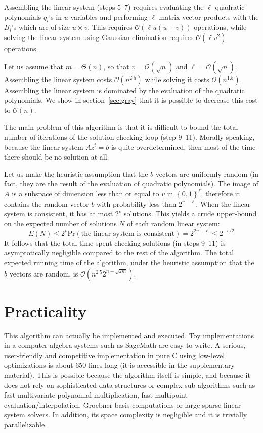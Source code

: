 \documentclass[a4paper,UKenglish,cleveref, autoref]{lipics-v2019}
\newcommand{\bits}{\left\{0, 1\right\}}
\newcommand{\bigO}[1]{\ensuremath{\mathcal{O}\left( #1 \right)} }
\newcommand{\bigTheta}[1]{\ensuremath{\Theta\left( #1 \right)} }
\begin{document}
Assembling the linear system (steps 5--7) requires evaluating the $\ell$
quadratic polynomials $q_i$'s in $u$ variables and performing $\ell$
matrix-vector products with the $B_i$'s which are of size $u \times v$.  This
requires $\bigO{\ell u(u+v)}$ operations, while solving the linear system using
Gaussian elimination requires $\bigO{\ell v^2}$ operations.

Let us assume that $m = \bigTheta{n}$, so that $v = \bigO{\sqrt{n}}$ and
$\ell = \bigO{\sqrt{n}}$. Assembling the linear system costs $\bigO{n^{2.5}}$
while solving it costs $\bigO{n^{1.5}}$. Assembling the linear system is
dominated by the evaluation of the quadratic polynomials. We show in
section~\ref{sec:gray} that it is possible to decrease this cost to $\bigO{n}$.

The main problem of this algorithm is that it is difficult to bound the total
number of iterations of the solution-checking loop (step 9--11). Morally
speaking, because the linear system $A z^t = b$ is quite overdetermined, then most
of the time there should be no solution at all.

Let us make the heuristic assumption that the $b$ vectors are uniformly random
(in fact, they are the result of the evaluation of quadratic polynomials). The
image of $A$ is a subspace of dimension less than or equal to $v$ in
$\bits^\ell$, therefore it contains the random vector $b$ with probability less
than $2^{v-\ell}$. When the linear system is consistent, it has at most $2^v$
solutions. This yields a crude upper-bound on the expected number of solutions
$N$ of each random linear system:
\[
  E(N) \leq 2^v \mathrm{Pr}(\text{the linear system is consistent}) = 2^{2v - \ell} \leq 2^{-v/2}
\]
It follows that the total time spent checking solutions (in steps 9--11) is
asymptotically negligible compared to the rest of the algorithm.  The total
expected running time of the algorithm, under the heuristic assumption that the
$b$ vectors are random, is $\bigO{n^{2.5} 2^{n - \sqrt{2m}}}$.


\section{Practicality}

This algorithm can actually be implemented and executed. Toy implementations in
a computer algebra systems such as \textsf{SageMath} are easy to write. A
serious, user-friendly and competitive implementation in pure C using low-level
optimizations is about 650 lines long (it is accessible in the supplementary
material). This is possible because the algorithm itself is simple, and because
it does not rely on sophisticated data structures or complex sub-algorithms such
as fast multivariate polynomial multiplication, fast multipoint
evaluation/interpolation, Groebner basis computations or large sparse linear
system solvers. In addition, its space complexity is negligible and it is
trivially parallelizable.
\end{document}

